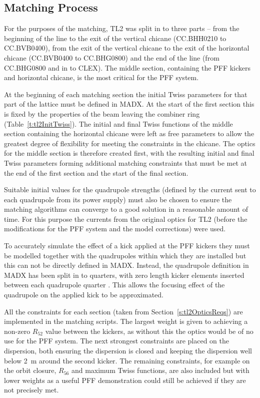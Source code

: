 \subsection{Matching Process}
\label{ss:matchingMethod}

For the purposes of the matching, TL2 was split in to three parts -- from the beginning of the line to the exit of the vertical chicane (CC.BHH0210 to CC.BVB0400), from the exit of the vertical chicane to the exit of the horizontal chicane (CC.BVB0400 to CC.BHG0800) and the end of the line (from CC.BHG0800 and in to CLEX). The middle section, containing the PFF kickers and horizontal chicane, is the most critical for the PFF system.

At the beginning of each matching section the initial Twiss parameters for that part of the lattice must be defined in MADX. At the start of the first section this is fixed by the properties of the beam leaving the combiner ring (Table~\ref{t:tl2InitTwiss}). The initial and final Twiss functions of the middle section containing the horizontal chicane were left as free parameters to allow the greatest degree of flexibility for meeting the constraints in the chicane. The optics for the middle section is therefore created first, with the resulting initial and final Twiss parameters forming additional matching constraints that must be met at the end of the first section and the start of the final section.

Suitable initial values for the quadrupole strengths (defined by the current sent to each quadrupole from its power supply) must also be chosen to ensure the matching algorithms can converge to a good solution in a reasonable amount of time. For this purpose the currents from the original optics for TL2 (before the modifications for the PFF system and the model corrections) were used. 

To accurately simulate the effect of a kick applied at the PFF kickers they must be modelled together with the quadrupoles within which they are installed but this can not be directly defined in MADX. Instead, the quadrupole definition in MADX has been split in to quarters, with zero length kicker elements inserted between each quadrupole quarter \cite{piotrPriv}. This allows the focusing effect of the quadrupole on the applied kick to be approximated.

All the constraints for each section (taken from Section~\ref{s:tl2OpticsReqs}) are implemented in the matching scripts. The largest weight is given to achieving a non-zero \(R_{52}\) value between the kickers, as without this the optics would be of no use for the PFF system. The next strongest constraints are placed on the dispersion, both ensuring the dispersion is closed and keeping the dispersion well below 2~m around the second kicker. The remaining constraints, for example on the orbit closure, \(R_{56}\) and maximum Twiss functions, are also included but with lower weights as a useful PFF demonstration could still be achieved if they are not precisely met.

